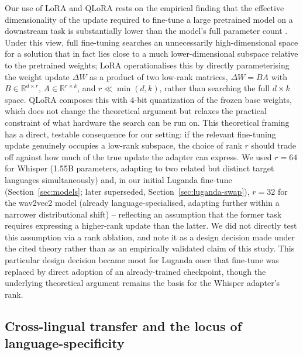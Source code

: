 \documentclass[11pt]{article}
\begin{document}
Our use of LoRA and QLoRA rests on the empirical finding that the effective dimensionality of the update required to fine-tune a large pretrained model on a downstream task is substantially lower than the model's full parameter count \cite{aghajanyan2021intrinsic}. Under this view, full fine-tuning searches an unnecessarily high-dimensional space for a solution that in fact lies close to a much lower-dimensional subspace relative to the pretrained weights; LoRA \cite{hu2022lora} operationalises this by directly parameterising the weight update $\Delta W$ as a product of two low-rank matrices, $\Delta W = BA$ with $B \in \mathbb{R}^{d \times r}$, $A \in \mathbb{R}^{r \times k}$, and $r \ll \min(d,k)$, rather than searching the full $d \times k$ space. QLoRA \cite{dettmers2023qlora} composes this with 4-bit quantization of the frozen base weights, which does not change the theoretical argument but relaxes the practical constraint of what hardware the search can be run on. This theoretical framing has a direct, testable consequence for our setting: if the relevant fine-tuning update genuinely occupies a low-rank subspace, the choice of rank $r$ should trade off against how much of the true update the adapter can express. We used $r=64$ for Whisper (1.55B parameters, adapting to two related but distinct target languages simultaneously) and, in our initial Luganda fine-tune (Section~\ref{sec:models}; later superseded, Section~\ref{sec:luganda-swap}), $r=32$ for the wav2vec2 model (already language-specialised, adapting further within a narrower distributional shift) -- reflecting an assumption that the former task requires expressing a higher-rank update than the latter. We did not directly test this assumption via a rank ablation, and note it as a design decision made under the cited theory rather than as an empirically validated claim of this study. This particular design decision became moot for Luganda once that fine-tune was replaced by direct adoption of an already-trained checkpoint, though the underlying theoretical argument remains the basis for the Whisper adapter's rank.

\subsection{Cross-lingual transfer and the locus of language-specificity}
\end{document}
